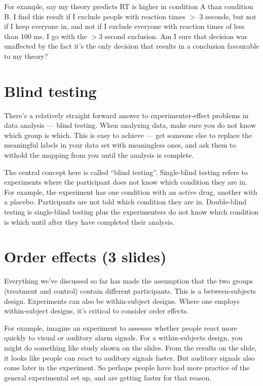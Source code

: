 \documentclass[12pt]{article}
\begin{document}
For example, say my theory predicts RT is higher in condition A than
condition B. I find this result if I exclude people with reaction
times $>$ 3 seconds, but not if I keep everyone in, and not if I
exclude everyone with reaction times of less than 100 ms. I go with
the $>$3 second exclusion. Am I sure that decision was unaffected by
the fact it's the only decision that results in a conclusion
favourable to my theory?

\section{Blind testing}

There's a relatively straight forward answer to experimenter-effect
problems in data analysis --- blind testing. When analyzing data, make
sure you do not know which group is which. This is easy to achieve ---
get someone else to replace the meaningful labels in your data set
with meaningless ones, and ask them to withold the mapping from you
until the analysis is complete.

The central concept here is called ``blind testing''. Single-blind
testing refers to experiments where the participant does not know
which condition they are in. For example, the experiment has one
condition with an active drug, another with a placebo. Participants
are not told which condition they are in. Double-blind testing is
single-blind testing plus the experimenters do not know which
condition is which until after they have completed their analysis.

\section{Order effects (3 slides)}

Everything we've discussed so far has made the assumption that the two
groups (treatment and control) contain different participants. This is
a between-subjects design. Experiments can also be within-subject
designs. Where one employs within-subject designs, it's critical to
consider order effects.

For example, imagine an experiment to assesses whether people react
more quickly to visual or auditory alarm signals. For a
within-subjects design, you might do something like study shown on the
slides. From the results on the slide, it looks like people can react
to auditory signals faster. But auditory signals also come later in
the experiment. So perhaps people have had more practice of the
general experimental set up, and are getting faster for that reason.
\end{document}
